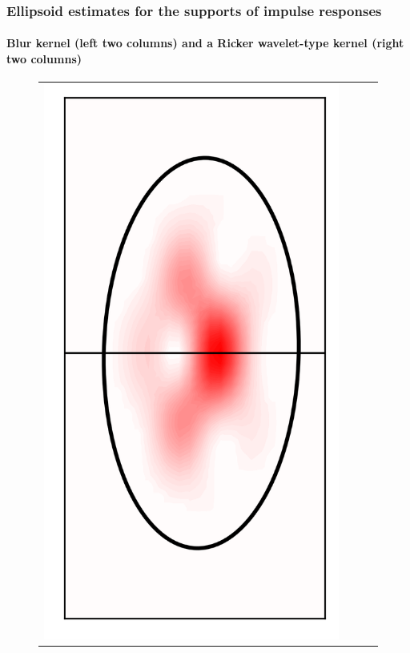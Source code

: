 \documentclass[10pt,final,xcolor=dvipsnames]{beamer}
\begin{document}
\begin{frame}
  \frametitle{Ellipsoid estimates for the supports
    of impulse responses} \framesubtitle{Blur kernel (left two
    columns) and a Ricker wavelet-type kernel (right two columns)}
  \begin{figure}
    \centering
	{
	  \begin{tabular}{cccc}
	    \includegraphics[scale=0.2]{localpsf_revised_figures/frog_ellipsoid_a=1.0.png} & 

\end{tabular}}
\end{figure}
\end{frame}
\end{document}
